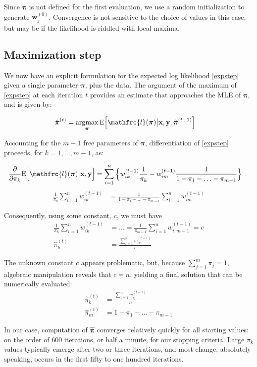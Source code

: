 \documentclass[12pt]{amsart}
\newcommand{\vect}[1]{\boldsymbol{\mathbf{#1}}}
\newcommand{\eqn}[1]{\begin{align*}
#1
\end{align*}}
\newcommand{\eqnl}[2]{\begin{align} \label{#1}
#2
\end{align}}
\newcommand{\Bl}{\Big\{}
\newcommand{\Br}{\Big\}}
\newcommand{\argmax}{\operatornamewithlimits{argmax}}
\newcommand{\vx}{\vect{x}}
\newcommand{\vy}{\vect{y}}
\newcommand{\vp}{\vect{\pi}}
\newcommand{\vph}{\hat{\vect{\pi}}}
\newcommand{\llp}{\mathfrc{l}(\vect{\pi})}
\newcommand{\sumn}{\sum^n_{i=1}}
\newcommand{\summ}{\sum^m_{j=1}}
\begin{document}
Since $\vp$ is not defined for the first evaluation, we use a random initialization to generate $\vect{w}_{j}^{(0)}$. Convergence is not sensitive to the choice of values in this case, but may be if the likelihood is riddled with local maxima.

\subsection{Maximization step}
We now have an explicit formulation for the expected log likelihood \eqref{expstep} given a single parameter $\vp$, plus the data. The argument of the maximum of \eqref{expstep} at each iteration $t$ provides an estimate that approaches the MLE of $\vp$, and is given by:

\eqnl{argmaxpi}{
	\vph^{(t)} &= \argmax_{\vp} \text{E}\Big[\llp \big| \vx,\vy,\vph^{(t-1)} \Big]   
}

Accounting for the $m-1$ free parameters of $\vp$, differentiation of \eqref{expstep} proceeds, for $k=1,\ldots,m-1$, as:

\eqn{
	\frac{\partial}{\partial \pi_k} \text{E}\Big[\llp \big| \vect{x},\vect{y}\Big]   &=      \sumn \Bl  w^{(t-1)}_{ik} \frac{1}{\pi_k} - w^{(t-1)}_{im} \frac{1}{1-\pi_1-\ldots-\pi_{m-1}}   \Br
}
\eqn{
	\frac{1}{\pi_k} \sumn w_{ik}^{(t-1)} &= \frac{1}{1-\pi_1-\ldots-\pi_{m-1}} \sumn w_{im}^{(t-1)}
}

Consequently, using some constant, $c$, we must have
\eqn{
	\frac{1}{\pi_k} \sumn w^{(t-1)}_{ik} &= \ldots = \frac{1}{\pi_{m-1}} \sumn w^{(t-1)}_{i,m-1} = c	\\
	\hat{\pi}_k^{(t)} &= \frac{\sumn w^{(t-1)}_{ik}}{c}
}

The unknown constant $c$ appears problematic, but, because $\summ \pi_j = 1$, algebraic manipulation reveals that $c=n$, yielding a final solution that can be numerically evaluated:
\eqn{
	\hat{\pi}^{(t)}_k &= \frac{\sumn w^{(t-1)}_{ij}}{n}	\\
	\hat{\pi}^{(t)}_m &= 1-\pi_1-\ldots-\pi_{m-1}
}

In our case, computation of $\vph$ converges relatively quickly for all starting values: on the order of 600 iterations, or half a minute, for our stopping criteria. Large $\pi_k$ values typically emerge after two or three iterations, and most change, absolutely speaking, occurs in the first fifty to one hundred iterations.
\end{document}
